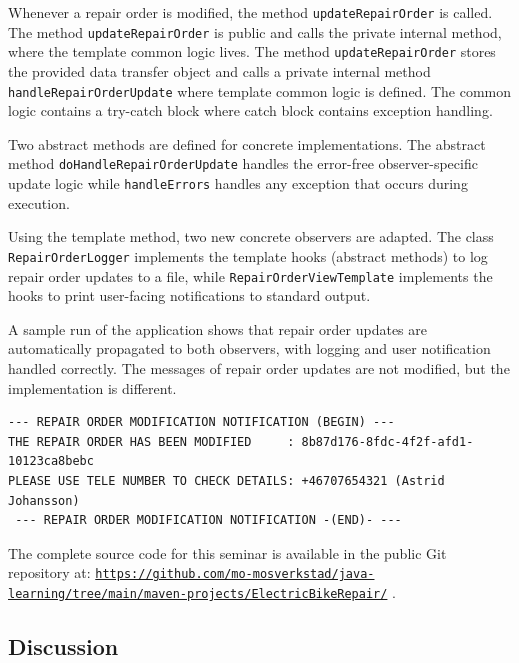 \documentclass[a4paper]{scrartcl}
\begin{document}
Whenever a repair order is modified, the method \texttt{updateRepairOrder} is called. The method \texttt{updateRepairOrder} is public and calls the private internal method, where the template common logic lives. The method \texttt{updateRepairOrder} stores the provided data transfer object and calls a private internal method \texttt{handleRepairOrderUpdate} where template common logic is defined. The common logic contains a try-catch block where catch block contains exception handling.

Two abstract methods are defined for concrete implementations. The abstract method \texttt{doHandleRepairOrderUpdate} handles the error-free observer-specific update logic while \texttt{handleErrors} handles any exception that occurs during execution.

Using the template method, two new concrete observers are adapted. The class \texttt{RepairOrderLogger} implements the template hooks (abstract methods) to log repair order updates to a file, while \texttt{RepairOrderViewTemplate} implements the hooks to print user-facing notifications to standard output.

A sample run of the application shows that repair order updates are automatically propagated to both observers, with logging and user notification handled correctly. The messages of repair order updates are not modified, but the implementation is different.

\begin{lstlisting}[style=outputstyle, caption={Printout of repair order application}]
 --- REPAIR ORDER MODIFICATION NOTIFICATION (BEGIN) ---
THE REPAIR ORDER HAS BEEN MODIFIED     : 8b87d176-8fdc-4f2f-afd1-10123ca8bebc
PLEASE USE TELE NUMBER TO CHECK DETAILS: +46707654321 (Astrid Johansson)
 --- REPAIR ORDER MODIFICATION NOTIFICATION -(END)- ---
\end{lstlisting}

The complete source code for this seminar is available in the public Git repository at: \href{https://github.com/mo-mosverkstad/java-learning/tree/main/maven-projects/ElectricBikeRepair/}{\nolinkurl{https://github.com/mo-mosverkstad/java-learning/tree/main/maven-projects/ElectricBikeRepair/}} \cite{sourcecode}.

\subsection{Discussion}
\end{document}
